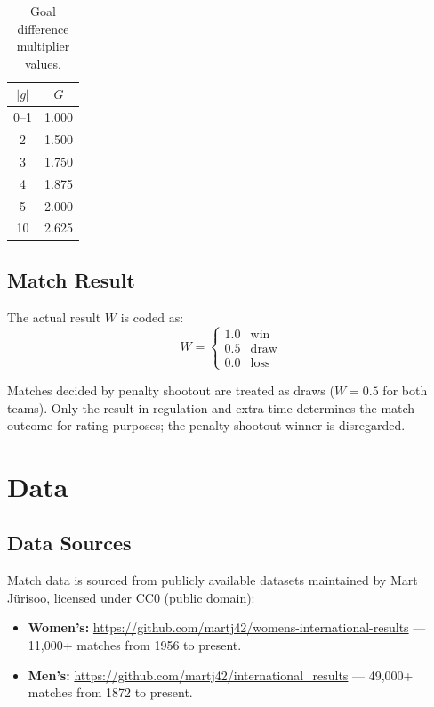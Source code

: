 \documentclass[11pt]{article}
\begin{document}
\begin{table}[h]
\centering
\begin{tabular}{@{}cc@{}}
\toprule
$|g|$ & $G$ \\
\midrule
0--1 & 1.000 \\
2 & 1.500 \\
3 & 1.750 \\
4 & 1.875 \\
5 & 2.000 \\
10 & 2.625 \\
\bottomrule
\end{tabular}
\caption{Goal difference multiplier values.}
\label{tab:gfactor}
\end{table}

\subsection{Match Result}
\label{sec:matchresult}

The actual result $W$ is coded as:
\[
W = \begin{cases}
1.0 & \text{win} \\
0.5 & \text{draw} \\
0.0 & \text{loss}
\end{cases}
\]

Matches decided by penalty shootout are treated as draws ($W = 0.5$ for both teams). Only the result in regulation and extra time determines the match outcome for rating purposes; the penalty shootout winner is disregarded.

\section{Data}

\subsection{Data Sources}

Match data is sourced from publicly available datasets maintained by Mart J\"urisoo, licensed under CC0 (public domain):
\begin{itemize}[nosep]
    \item \textbf{Women's:} \url{https://github.com/martj42/womens-international-results} --- 11,000+ matches from 1956 to present.
    \item \textbf{Men's:} \url{https://github.com/martj42/international_results} --- 49,000+ matches from 1872 to present.
\end{itemize}
\end{document}
